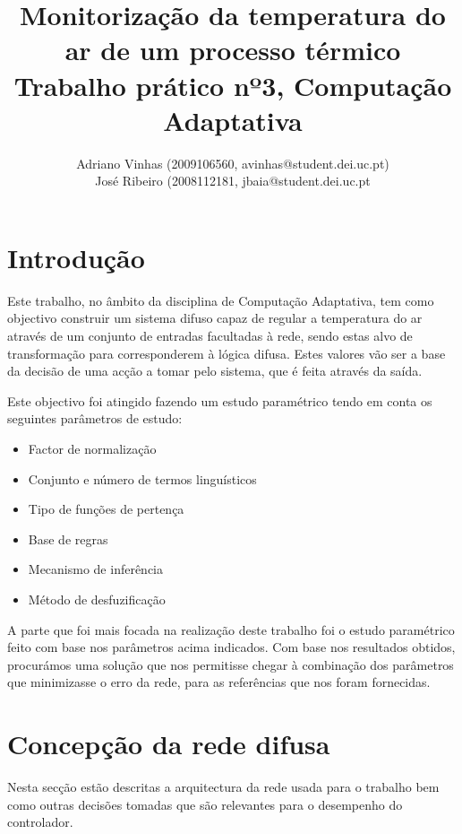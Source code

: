 \documentclass{article}
\begin{document}
\title{Monitorização da temperatura do ar de um processo térmico \\ Trabalho prático nº3, Computação Adaptativa}
\author{Adriano Vinhas (2009106560, avinhas@student.dei.uc.pt)\\
		José Ribeiro (2008112181, jbaia@student.dei.uc.pt}
\maketitle
\clearpage

\section{Introdução}

\indent \indent Este trabalho, no âmbito da disciplina de Computação Adaptativa, tem como objectivo construir um sistema difuso capaz de regular a temperatura do ar através de um conjunto de entradas facultadas à rede, sendo estas alvo de transformação para corresponderem à lógica difusa. Estes valores vão ser a base da decisão de uma acção a tomar pelo sistema, que é feita através da saída.

Este objectivo foi atingido fazendo um estudo paramétrico tendo em conta os seguintes parâmetros de estudo:
\begin{itemize}
\item Factor de normalização
\item Conjunto e número de termos linguísticos
\item Tipo de funções de pertença
\item Base de regras
\item Mecanismo de inferência
\item Método de desfuzificação
\end{itemize}

A parte que foi mais focada na realização deste trabalho foi o estudo paramétrico feito com base nos parâmetros acima indicados. Com base nos resultados obtidos, procurámos uma solução que nos permitisse chegar à combinação dos parâmetros que minimizasse o erro da rede, para as referências que nos foram fornecidas.

\clearpage
\section{Concepção da rede difusa}
\indent \indent Nesta secção estão descritas a arquitectura da rede usada para o trabalho bem como outras decisões tomadas que são relevantes para o desempenho do controlador.
\end{document}
